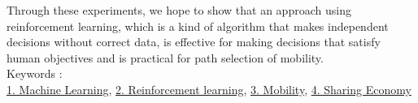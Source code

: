 Through these experiments, we hope to show that an approach using reinforcement learning, which is a kind of algorithm that makes independent decisions without correct data, is effective for making decisions that satisfy human objectives and is practical for path selection of mobility.
~ \\
Keywords : \\
\underline{1. Machine Learning},
\underline{2. Reinforcement learning},
\underline{3. Mobility},
\underline{4. Sharing Economy}
\begin{flushright}
\edept \\
\eauthor
\end{flushright}
